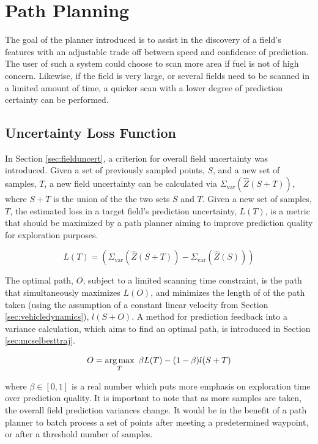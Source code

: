 \chapter{Path Planning} \label{ch:pp}
The goal of the planner introduced is to assist in the discovery of a field's features with an adjustable trade off between speed and confidence of prediction. The user of such a system could choose to scan more area if fuel is not of high concern. Likewise, if the field is very large, or several fields need to be scanned in a limited amount of time, a quicker scan with a lower degree of prediction certainty can be performed.

\section{Uncertainty Loss Function} \label{sec:lossfunc}
In Section \ref{sec:fielduncert}, a criterion for overall field uncertainty was introduced. Given a set of previously sampled points, $S$, and a new set of samples, $T$, a new field uncertainty can be calculated via $\Sigma_{\text{var}}(\hat{Z}(S + T))$, where $S + T$ is the union of the the two sets $S$ and $T$. Given a new set of samples, $T$, the estimated loss in a target field's prediction uncertainty, $L(T)$, is a metric that should be maximized by a path planner aiming to improve prediction quality for exploration purposes.

\begin{equation}
	L(T) = (\Sigma_{\text{var}}(\hat{Z}(S+T)) - \Sigma_{\text{var}}(\hat{Z}(S)))
	\label{eq:lossfunc}
\end{equation}

The optimal path, $O$, subject to a limited scanning time constraint, is the path that simultaneously maximizes $L(O)$, and minimizes the length of of the path taken (using the assumption of a constant linear velocity from Section \ref{sec:vehicledynamics}), $l(S + O)$. A method for prediction feedback into a variance calculation, which aims to find an optimal path, is introduced in Section \ref{sec:mcselbesttraj}.

\begin{equation}
	O = \operatorname*{arg\,max}_T\ \beta L(T) - (1-\beta)l(S + T)
\end{equation}

\noindent where $\beta \in [0,1]$ is a real number which puts more emphasis on exploration time over prediction quality. It is important to note that as more samples are taken, the overall field prediction variances change. It would be in the benefit of a path planner to batch process a set of points after meeting a predetermined waypoint, or after a threshold number of samples. 

